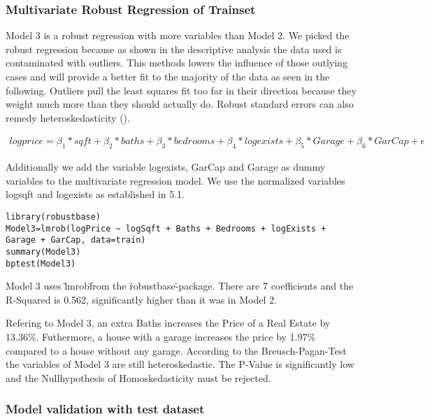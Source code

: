 \subsubsection{Multivariate Robust Regression of Trainset}

Model 3 is a robust regression with more variables than Model 2. We picked the robust regression because as shown in the descriptive analysis the data used is contaminated with outliers. This methods lowers the influence of those outlying cases and will provide a better fit to the majority of the data as seen in the following. Outliers pull the least squares fit too far in their direction because they weight much more than they should actually do. Robust standard errors can also remedy heteroskedasticity (\cite{robust}). %



\begin{align}
logprice = \beta_{1} * sqft +  \beta_{2}* baths + \beta_{3}* bedrooms + \beta_{4}* logexists + \beta_{5}* Garage + \beta_{6}* GarCap + \epsilon 
\end{align}

Additionally we add the variable logexists, GarCap and Garage as dummy variables to the multivariate regression model. We use the normalized variables logsqft and logexists as established in 5.1. 

\begin{lstlisting}[frame = single,backgroundcolor=\color{hellgelb}]
library(robustbase)
Model3=lmrob(logPrice ~ logSqft + Baths + Bedrooms + logExists + Garage + GarCap, data=train)
summary(Model3)
bptest(Model3)
\end{lstlisting}

Model 3 uses \"lmrob\" from the \"robustbase\"-package. There are 7 coefficients and the R-Squared is 0.562, significantly higher than it was in Model 2. 

Refering to Model 3, an extra Baths increases the Price of a Real Estate by 13.36\%. Futhermore, a house with a garage increases the price by 1.97\% compared to a house without any garage. According to the Breusch-Pagan-Test the variables of Model 3 are still heteroskedastic. The P-Value is significantly low and the Nullhypothesis of Homoskedasticity must be rejected. 

\subsubsection{Model validation with test dataset}

